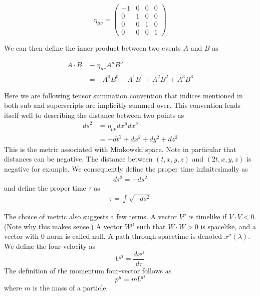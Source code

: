 \documentclass[book.tex]{subfiles}
\begin{document}
\begin{equation}
    \eta_{\mu\nu} = \begin{pmatrix}
    -1 & 0 & 0 & 0 \\
    0  & 1 & 0 & 0 \\
    0  & 0 & 1 & 0 \\
    0  & 0 & 0 & 1
    \end{pmatrix}
\end{equation}

We can then define the inner product between two events $A$ and $B$ as

\begin{align}
    A \cdot B &\equiv \eta_{\mu\nu} A^{\mu} B^{\nu} \\
    &= - A^0B^0 + A^1 B^1 + A^2 B^2 + A^3 B^3
\end{align}

Here we are following tensor summation convention that indices mentioned in both sub and superscripts are implicitly summed over. This convention lends itself well to describing the distance between two points as 
\begin{align}
    ds^2 &= \eta_{\mu\nu} dx^{\mu} dx^{\nu} \\
    &= -dt^2 + dx^2 + dy^2 + dz^2
\end{align}
This is the metric associated with Minkowski space. Note in particular that distances can be negative. The distance between $(t, x, y, z)$ and $(2t, x, y, z)$ is negative for example. We consequently define the proper time infinitesimally as
\begin{align}
    d\tau^2 = - ds^2
\end{align}
and define the proper time $\tau$ as
\begin{align}
    \tau = \int \sqrt{-ds^2}
\end{align}


The choice of metric also suggests a few terms. A vector $V^{\mu}$ is timelike if $V \cdot V < 0$. (Note why this makes sense.) A vector $W^{\mu}$ such that $W \cdot W > 0$ is spacelike, and a vector with 0 norm is called null. A path through spacetime is denoted $x^{\mu}(\lambda)$. We define the four-velocity as 
\begin{equation}
    U^{\mu} = \frac{dx^{\mu}}{d\tau}
\end{equation}
The definition of the momentum four-vector follows as
\begin{equation}
    p^{\mu} = m U^{\mu}
\end{equation}
where $m$ is the mass of a particle. 
\end{document}
